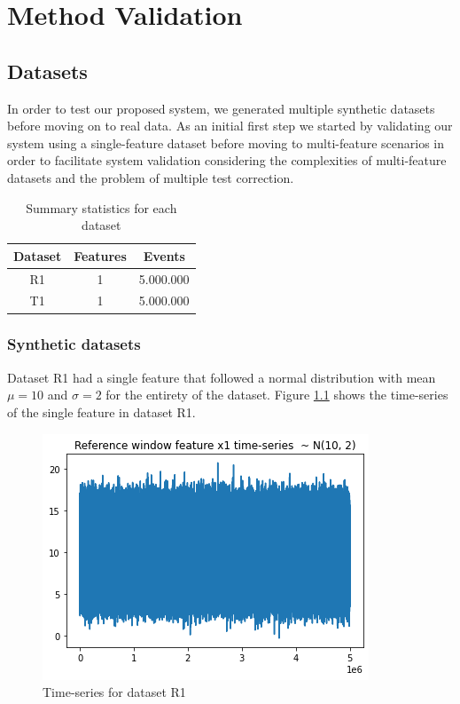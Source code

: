 \chapter{Method Validation} \label{chap:validation} \minitoc

\section{Datasets}

In order to test our proposed system, we generated multiple synthetic datasets before moving on to real data. As an initial first step we started by validating our system using a single-feature dataset before moving to multi-feature scenarios in order to facilitate system validation considering the complexities of multi-feature datasets and the problem of multiple test correction.


\begin{table}[!htb]
    \begin{center}
        \begin{tabular}{|c|c|c|}
        \hline
        \textbf{Dataset} & \textbf{Features} & \textbf{Events} \\ \hline
        R1               & 1                 & 5.000.000       \\ \hline
        T1               & 1                 & 5.000.000       \\ \hline
        
        \end{tabular}
    \end{center}
    \caption{Summary statistics for each dataset}
    \label{tbl:summary-statistics}
\end{table}

\subsection{Synthetic datasets}
Dataset R1 had a single feature that followed a normal distribution with mean $\mu=10$ and $\sigma=2$ for the entirety of the dataset. Figure \ref{fig:timeseries-r1} shows the time-series of the single feature in dataset R1.

\begin{figure}[!htb]
    \begin{center}
      \includegraphics[scale=0.6]{figures/01-reference.png}
      \caption[]{Time-series for dataset R1}
      \label{fig:timeseries-r1}
    \end{center}
\end{figure}


